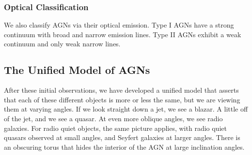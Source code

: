 \documentclass[10pt]{article}
\numberwithin{equation}{section}
\begin{document}
	\subsubsection{Optical Classification} %
	\label{ssub:optical_classification}
	We also classify AGNs via their optical emission. Type I AGNs have a strong continuum  with broad and narrow emission lines. Type II AGNs exhibit a weak continuum and only weak narrow lines.
	\subsection{The Unified Model of AGNs} %
	\label{sub:the_unified_model_of_agns}
	After these initial observations, we have developed a unified model that asserts that each of these different objects is more or less the same, but we are viewing them at varying angles. If we look straight down a jet, we see a blazar. A little off of the jet, and we see a quasar. At even more oblique angles, we see radio galaxies. For radio quiet objects, the same picture applies, with radio quiet quasars observed at small angles, and Seyfert galaxies at larger angles. There is an obscuring torus that hides the interior of the AGN at large inclination angles.
	

\end{document}
